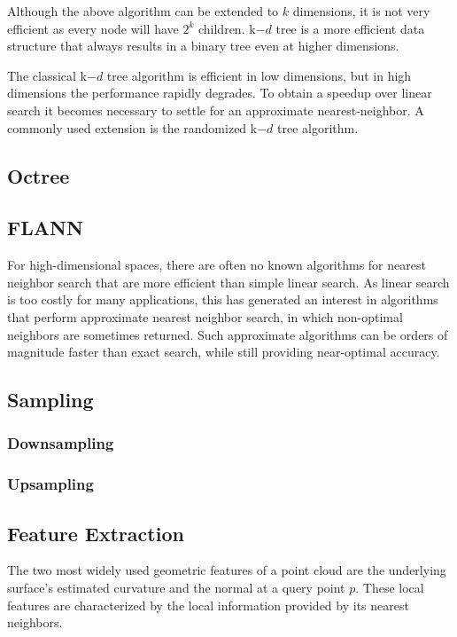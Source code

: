 \documentclass[a4paper, 11pt, twocolumn]{article}
\begin{document}
Although the above algorithm can be extended to $k$ dimensions, it is not very efficient as every node will have $2^k$ children. k$-d$ tree is a more efficient data structure that always results in a binary tree even at higher dimensions.


The classical k$-d$ tree algorithm is efficient in low dimensions, but in high dimensions the performance rapidly degrades. To obtain a speedup over linear search it becomes necessary to settle for an approximate nearest-neighbor. A commonly used extension is the randomized k$-d$ tree algorithm.

\subsection{Octree}

\subsection{FLANN}
For high-dimensional spaces, there are often no known algorithms for nearest neighbor search that are more efficient than simple linear search. As linear search is too costly for many applications, this has generated an interest in algorithms that perform approximate nearest neighbor search, in which non-optimal neighbors are sometimes returned. Such approximate algorithms can be orders of magnitude faster than exact search, while still providing near-optimal accuracy.


\subsection{Sampling}

\subsubsection{Downsampling}

\subsubsection{Upsampling}



\subsection{Feature Extraction}

The two most widely used geometric features of a point cloud are the underlying surface's estimated curvature and the normal at a query point $p$. These local features are characterized by the local information provided by its nearest neighbors.
\end{document}
